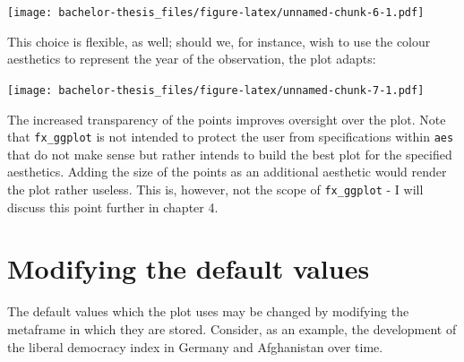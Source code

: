 \documentclass[]{report}
\newenvironment{Shaded}{\begin{snugshade}}{\end{snugshade}}
\newcommand{\KeywordTok}[1]{\textcolor[rgb]{0.13,0.29,0.53}{\textbf{#1}}}
\newcommand{\DataTypeTok}[1]{\textcolor[rgb]{0.13,0.29,0.53}{#1}}
\newcommand{\StringTok}[1]{\textcolor[rgb]{0.31,0.60,0.02}{#1}}
\newcommand{\OperatorTok}[1]{\textcolor[rgb]{0.81,0.36,0.00}{\textbf{#1}}}
\newcommand{\NormalTok}[1]{#1}
\theoremstyle{definition}
\theoremstyle{definition}
\theoremstyle{definition}
\theoremstyle{remark}
\begin{document}
\texttt{[image: bachelor-thesis\_files/figure-latex/unnamed-chunk-6-1.pdf]}

This choice is flexible, as well; should we, for instance, wish to use
the colour aesthetics to represent the year of the observation, the plot
adapts:

\begin{Shaded}
\end{Shaded}

\texttt{[image: bachelor-thesis\_files/figure-latex/unnamed-chunk-7-1.pdf]}

The increased transparency of the points improves oversight over the
plot. Note that \texttt{fx\_ggplot} is not intended to protect the user
from specifications within \texttt{aes} that do not make sense but
rather intends to build the best plot for the specified aesthetics.
Adding the size of the points as an additional aesthetic would render
the plot rather useless. This is, however, not the scope of
\texttt{fx\_ggplot} - I will discuss this point further in chapter 4.

\section{Modifying the default
values}\label{modifying-the-default-values}

The default values which the plot uses may be changed by modifying the
metaframe in which they are stored. Consider, as an example, the
development of the liberal democracy index in Germany and Afghanistan
over time.

\begin{Shaded}
\end{Shaded}
\end{document}
